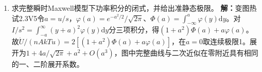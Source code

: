 \documentclass[UTF8,fontset=fandol,a4paper,11pt]{ctexart}
\begin{document}
\begin{enumerate}
\item 求完整瞬时Maxwell模型下功率积分的闭式，并给出准静态极限。
\textbf{解：}变图热试2.3V5令$a=u/s$，$\varphi(a)=e^{-a^2/2}/\sqrt{2\pi}$、$\Phi(a)=\int_{-\infty}^a\varphi(y)\mathrm dy$。对$I/s^2=\int_{-a}^\infty(y+a)^2\varphi(y)\mathrm dy$分三项积分，得$(1+a^2)\Phi(a)+a\varphi(a)$。故$\dot U/(nAkTu)=2[(1+a^2)\Phi(a)+a\varphi(a)]$，在$a=0$取连续极限1。展开为$1+4a/\sqrt{2\pi}+a^2+O(a^3)$，图中完整曲线与二次近似在零附近具有相同的一、二阶展开系数。
\begin{center}\begin{minipage}{.98\linewidth}\centering
{}
\end{minipage}
\end{center}
\end{enumerate}
\end{document}
